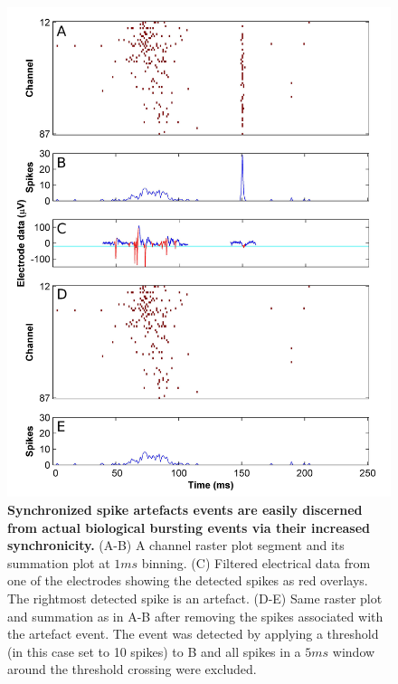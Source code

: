 \begin{figure}[!htb]
\centering
\includegraphics[width=14cm]{chapter2/figures/syncArtefact/syncArtefact.jpg}
\caption[Example for synchrony based spike artefact removal]{\textbf{Synchronized spike artefacts events are easily discerned from actual biological bursting events via their increased synchronicity.} (A-B) A channel raster plot segment and its summation plot at \(1ms\) binning. (C) Filtered electrical data from one of the electrodes showing the detected spikes as red overlays. The rightmost detected spike is an artefact. (D-E) Same raster plot and summation as in A-B after removing the spikes associated with the artefact event. The event was detected by applying a threshold (in this case set to 10 spikes) to B and all spikes in a \(5ms\) window around the threshold crossing were excluded.}

\label{fig:methods:syncArtefact}

\end{figure}

